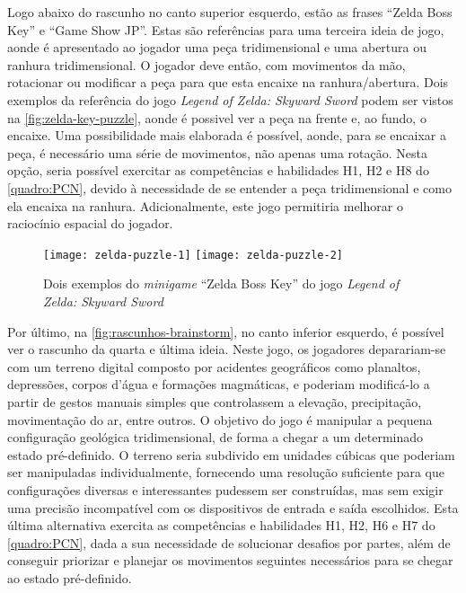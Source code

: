 Logo abaixo do rascunho no canto superior esquerdo, estão as 
frases ``Zelda Boss Key'' e ``Game Show JP''. Estas são referências 
para uma terceira ideia de jogo, aonde é apresentado ao jogador 
uma peça tridimensional e uma abertura ou ranhura tridimensional. 
O jogador deve então, com movimentos da mão, rotacionar ou modificar 
a peça para que esta encaixe na ranhura/abertura. Dois exemplos da 
referência do jogo \textit{Legend of Zelda: Skyward Sword} podem 
ser vistos na \autoref{fig:zelda-key-puzzle}, aonde é possivel ver
a peça na frente e, ao fundo, o encaixe. Uma possibilidade mais elaborada 
é possível, aonde, para se encaixar a peça, é necessário uma série 
de movimentos, não apenas uma rotação. Nesta opção, seria possível 
exercitar as competências e habilidades H1, H2 e H8 do 
\autoref{quadro:PCN}, devido à necessidade de se entender a peça 
tridimensional e como ela encaixa na ranhura. Adicionalmente, este 
jogo permitiria melhorar o raciocínio espacial do jogador.

\begin{figure}[h]
	\centering
	\caption{Dois exemplos do \textit{minigame} ``Zelda Boss Key'' do jogo \textit{Legend of Zelda: Skyward Sword}}
	\texttt{[image: zelda-puzzle-1]}
	\texttt{[image: zelda-puzzle-2]}
	\label{fig:zelda-key-puzzle}
\end{figure}

Por último, na \autoref{fig:rascunhos-brainstorm}, no canto inferior esquerdo,
é possível ver o rascunho da quarta e última ideia. Neste jogo, os 
jogadores deparariam-se com um terreno digital composto por acidentes
geográficos como planaltos, depressões, corpos d'água e formações magmáticas, 
e poderiam modificá-lo a partir de gestos manuais simples que controlassem 
a elevação, precipitação, movimentação do ar, entre outros. O objetivo do jogo
é manipular a pequena configuração geológica tridimensional, de forma a chegar 
a um determinado estado pré-definido. O terreno seria subdivido em unidades 
cúbicas que poderiam ser manipuladas individualmente, fornecendo uma 
resolução suficiente para que configurações diversas e interessantes pudessem 
ser construídas, mas sem exigir uma precisão incompatível com os dispositivos 
de entrada e saída escolhidos. Esta última alternativa exercita as 
competências e habilidades H1, H2, H6 e H7 do \autoref{quadro:PCN}, dada 
a sua necessidade de solucionar desafios por partes, além de conseguir priorizar e
planejar os movimentos seguintes necessários para se chegar ao estado
pré-definido.

